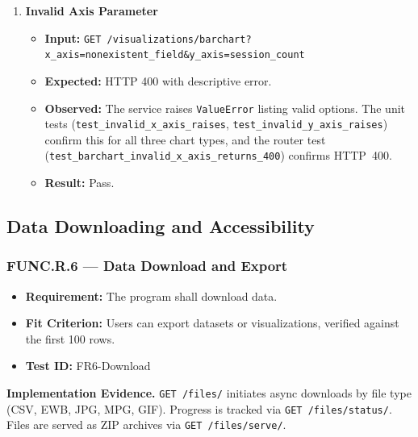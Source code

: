\documentclass[12pt, titlepage]{article}
\begin{document}
\begin{enumerate}[label=\textbf{FR5-T\arabic*:}, leftmargin=*, labelsep=1em]
  \item \textbf{Invalid Axis Parameter}
  \begin{itemize}
    \item \textbf{Input:} \texttt{GET /visualizations/\allowbreak{}barchart?x\_\allowbreak{}axis=nonexistent\_\allowbreak{}field\&y\_\allowbreak{}axis=session\_\allowbreak{}count}
    \item \textbf{Expected:} HTTP 400 with descriptive error.
    \item \textbf{Observed:} The service raises \texttt{ValueError} listing valid options.
      The unit tests (\texttt{test\_\allowbreak{}invalid\_\allowbreak{}x\_\allowbreak{}axis\_\allowbreak{}raises},
      \texttt{test\_\allowbreak{}invalid\_\allowbreak{}y\_\allowbreak{}axis\_\allowbreak{}raises}) confirm this for all three chart types,
      and the router test (\texttt{test\_\allowbreak{}barchart\_\allowbreak{}invalid\_\allowbreak{}x\_\allowbreak{}axis\_\allowbreak{}returns\_400}) confirms HTTP~400.
    \item \textbf{Result:} Pass.
  \end{itemize}

\end{enumerate}

\subsection{Data Downloading and Accessibility}

\subsubsection{FUNC.R.6 --- Data Download and Export}

\begin{itemize}
  \item \textbf{Requirement:} The program shall download data.
  \item \textbf{Fit Criterion:} Users can export datasets or visualizations, verified against the first 100 rows.
  \item \textbf{Test ID:} FR6-Download
\end{itemize}

\begin{sloppypar}
\noindent\textbf{Implementation Evidence.}
\texttt{GET /files/} initiates async downloads by file type (CSV, EWB, JPG, MPG, GIF). Progress is tracked
via \texttt{GET /files/\allowbreak{}status/}. Files are served as ZIP archives via \texttt{GET /files/\allowbreak{}serve/}.
\end{sloppypar}
\end{document}
